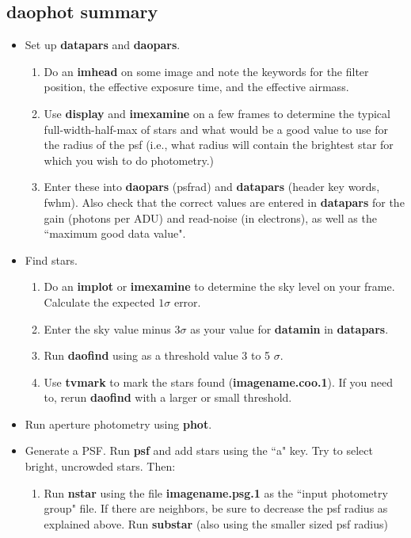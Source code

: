 \subsection{{\bf daophot} summary}
\begin{itemize}
\item Set up {\bf datapars} and {\bf daopars}.
	\begin{enumerate}
	\item Do an {\bf imhead} on some image and note the keywords for the
	filter position, the effective exposure time, and the effective
	airmass.
	\item Use {\bf display} and {\bf imexamine} on a few frames to 
	determine the typical full-width-half-max
	of stars and what would be a good
	value to use for the radius of the psf (i.e., what radius will
	contain the brightest star for which you wish to do photometry.)
        \item Enter these into {\bf daopars} (psfrad) and {\bf datapars}
	(header key words, fwhm).  Also check that the correct values
	are entered in {\bf datapars} for the gain (photons per ADU)
	and read-noise (in electrons), as well as the ``maximum good data
	value".
	\end{enumerate}
\item Find stars.
	\begin {enumerate}
	\item Do an {\bf implot} or {\bf imexamine} to determine the sky
	level on your frame.  Calculate the expected $1\sigma$ error.
	\item Enter the sky value minus 3$\sigma$ as your value for
	{\bf datamin} in {\bf datapars}.
	\item Run {\bf daofind} using as a threshold value 3 to 5 $\sigma$.
	\item Use {\bf tvmark} to mark the stars found ({\bf imagename.coo.1}).
	If you need to, rerun {\bf daofind} with a larger or small
	threshold.
	\end {enumerate}
\item Run aperture photometry using {\bf phot}.  
\item Generate a PSF. Run {\bf psf} and add stars using the ``a" key.  Try
      to select bright, uncrowded stars. Then:
	\begin {enumerate}
	\item Run {\bf nstar} using the file {\bf imagename.psg.1} as the
	``input photometry group" file.  If there are neighbors, be sure
	to decrease the psf radius as explained above.
	Run {\bf substar}  (also using the smaller sized psf radius)

\end{enumerate}
\end{itemize}
